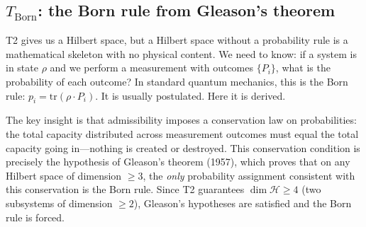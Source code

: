 \documentclass[11pt]{article}
\begin{document}
\subsection{\texorpdfstring{$T_{\mathrm{Born}}$}{T Born}: the Born rule from Gleason's theorem}

T2 gives us a Hilbert space, but a Hilbert space without a probability rule is a mathematical skeleton with no physical content.  We need to know: if a system is in state $\rho$ and we perform a measurement with outcomes $\{P_i\}$, what is the probability of each outcome?  In standard quantum mechanics, this is the Born rule: $p_i = \mathrm{tr}(\rho \cdot P_i)$.  It is usually postulated.  Here it is derived.

The key insight is that admissibility imposes a conservation law on probabilities: the total capacity distributed across measurement outcomes must equal the total capacity going in---nothing is created or destroyed.  This conservation condition is precisely the hypothesis of Gleason's theorem (1957), which proves that on any Hilbert space of dimension $\ge 3$, the \emph{only} probability assignment consistent with this conservation is the Born rule.  Since T2 guarantees $\dim \mathcal{H} \ge 4$ (two subsystems of dimension $\ge 2$), Gleason's hypotheses are satisfied and the Born rule is forced.
\end{document}
